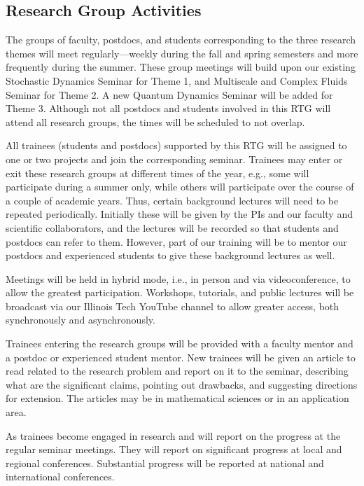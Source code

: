 \documentclass[11pt]{NSFamsart}
\begin{document}
\subsection{Research Group Activities}
The groups of faculty, postdocs, and students corresponding to the three research themes will meet regularly---weekly during the fall and spring semesters and more frequently during the summer.  These group meetings will build upon our existing Stochastic Dynamics Seminar for Theme 1, and Multiscale and Complex Fluids Seminar for Theme 2. A new Quantum Dynamics Seminar will be added for Theme 3.  Although not all postdocs and students involved in this RTG will attend all research groups, the times will be scheduled to not overlap. 

All trainees (students and postdocs) supported by this RTG will be assigned to one or two projects and join the corresponding seminar.  Trainees may enter or exit these research groups at different times of the year, e.g., some will participate during a summer only, while others will participate over the course of a couple of academic years. Thus, certain background lectures will need to be repeated periodically.  Initially these will be given by the PIs and our faculty and scientific collaborators, and the lectures will be recorded so that students and postdocs can refer to them.  However, part of our training will be to mentor our postdocs and experienced students to give these background lectures as well.  

Meetings will be held in hybrid mode, i.e., in person and via videoconference, to allow the greatest participation.  Workshops, tutorials, and public lectures will be broadcast via our Illinois Tech YouTube channel to allow greater access, both synchronously and asynchronously.

Trainees entering the research groups will be provided with a faculty mentor and a postdoc or experienced student mentor.  New trainees will be given an article to read related to the research problem and report on it to the seminar, describing what are the significant claims, pointing out drawbacks, and suggesting directions for extension. The articles may be in mathematical sciences or in an application area.

As trainees become engaged in research and will report on the progress at the regular seminar meetings. They will report on significant progress at local and regional conferences.  Substantial progress will be reported at national and international conferences.
\end{document}
